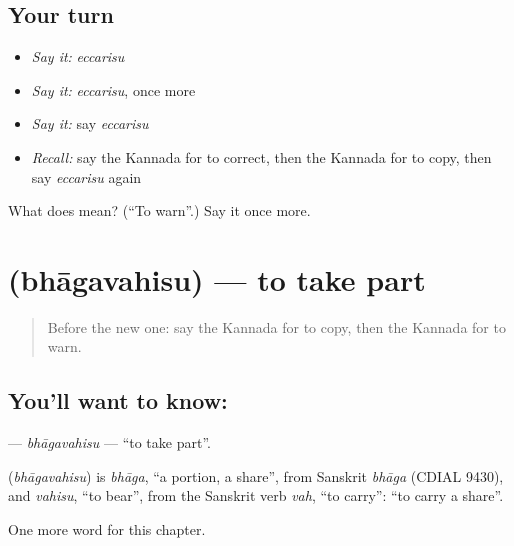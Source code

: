 \subsection*{Your turn}
\begin{itemize}
\raggedright
  \item \emph{Say it:} \emph{eccarisu}
  \item \emph{Say it:} \emph{eccarisu}, once more
  \item \emph{Say it:} say \emph{eccarisu}
  \item \emph{Recall:} say the Kannada for to correct, then the Kannada for to copy, then say \emph{eccarisu} again
\end{itemize}

\begin{tcolorbox}[breakable,colback=teal!4,colframe=teal!35!black,title={Before you move on}]
What does  mean? (\textquotedblleft{}To warn\textquotedblright{}.) Say it once more.
\end{tcolorbox}
\section[\texorpdfstring{\kn{ಭಾಗವಹಿಸು} (bhāgavahisu)}{ಭಾಗವಹಿಸು (bhāgavahisu)}]{ (bhāgavahisu) — to take part}

\label{lesson:KA-C162-bhagavahisu}



\begin{quote}
Before the new one: say the Kannada for to copy, then the Kannada for to warn.
\end{quote}

\subsection*{You'll want to know: }
\textbf{} — \emph{bhāgavahisu} — \textquotedblleft{}to take part\textquotedblright{}.

\begin{cousinweb}
\textbf{} (\emph{bhāgavahisu}) is \emph{bhāga}, \textquotedblleft{}a portion, a share\textquotedblright{}, from Sanskrit \emph{bhāga} (CDIAL 9430), and \emph{vahisu}, \textquotedblleft{}to bear\textquotedblright{}, from the Sanskrit verb \emph{vah}, \textquotedblleft{}to carry\textquotedblright{}: \textquotedblleft{}to carry a share\textquotedblright{}.
\end{cousinweb}

\begin{grammarlens}[title={What you've built}]
One more word for this chapter.
\end{grammarlens}

